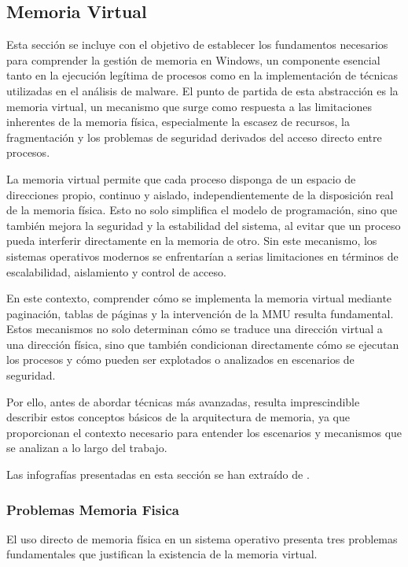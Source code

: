 \subsection{Memoria Virtual}

Esta sección se incluye con el objetivo de establecer los fundamentos necesarios para comprender la gestión de memoria en Windows, un componente esencial tanto en la ejecución legítima de procesos como en la implementación de técnicas utilizadas en el análisis de malware. El punto de partida de esta abstracción es la memoria virtual, un mecanismo que surge como respuesta a las limitaciones inherentes de la memoria física, especialmente la escasez de recursos, la fragmentación y los problemas de seguridad derivados del acceso directo entre procesos.

La memoria virtual permite que cada proceso disponga de un espacio de direcciones propio, continuo y aislado, independientemente de la disposición real de la memoria física. Esto no solo simplifica el modelo de programación, sino que también mejora la seguridad y la estabilidad del sistema, al evitar que un proceso pueda interferir directamente en la memoria de otro. Sin este mecanismo, los sistemas operativos modernos se enfrentarían a serias limitaciones en términos de escalabilidad, aislamiento y control de acceso.

En este contexto, comprender cómo se implementa la memoria virtual mediante paginación, tablas de páginas y la intervención de la MMU resulta fundamental. Estos mecanismos no solo determinan cómo se traduce una dirección virtual a una dirección física, sino que también condicionan directamente cómo se ejecutan los procesos y cómo pueden ser explotados o analizados en escenarios de seguridad.

Por ello, antes de abordar técnicas más avanzadas, resulta imprescindible describir estos conceptos básicos de la arquitectura de memoria, ya que proporcionan el contexto necesario para entender los escenarios y mecanismos que se analizan a lo largo del trabajo.

Las infografías presentadas en esta sección se han extraído de \cite{memoria_virtual_paging}.

\subsubsection{Problemas Memoria Fisica}

El uso directo de memoria física en un sistema operativo presenta tres problemas fundamentales que justifican la existencia de la memoria virtual.

